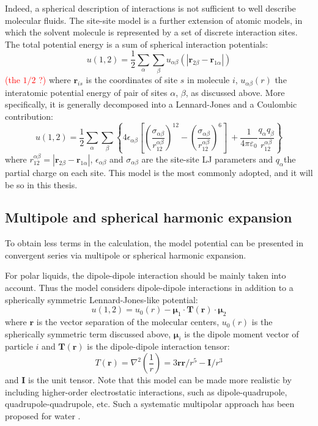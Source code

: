 Indeed, a spherical description of interactions is not sufficient
to well describe molecular fluids. The site-site model is a further
extension of atomic models, in which the solvent molecule is represented
by a set of discrete interaction sites. The total potential energy
is a sum of spherical interaction potentials:
\begin{equation}
u(1,2)=\frac{1}{2}\sum_{\alpha}\sum_{\beta}u_{\alpha\beta}(\left|\mathbf{r}_{2\beta}-\mathbf{r}_{1\alpha}\right|)
\end{equation}
\textcolor{red}{(the $1/2$ ?) }where $\mathbf{r}_{is}$ is the coordinates
of site $s$ in molecule $i$, $u_{\alpha\beta}(r)$ the interatomic
potential energy of pair of sites $\alpha$, $\beta$, as discussed
above. More specifically, it is generally decomposed into a Lennard-Jones
and a Coulombic contribution:
\begin{equation}
u(1,2)=\frac{1}{2}\sum_{\alpha}\sum_{\beta}\left\{ 4\epsilon_{\alpha\beta}\left[\left(\frac{\sigma_{\alpha\beta}}{r_{12}^{\alpha\beta}}\right)^{12}-\left(\frac{\sigma_{\alpha\beta}}{r_{12}^{\alpha\beta}}\right)^{6}\right]\:+\frac{1}{4\pi\varepsilon_{0}}\frac{q_{\alpha}q_{\beta}}{r_{12}^{\alpha\beta}}\right\} 
\end{equation}
where $r_{12}^{\alpha\beta}=\left|\mathbf{r}_{2\beta}-\mathbf{r}_{1\alpha}\right|$,
$\epsilon_{\alpha\beta}$ and $\sigma_{\alpha\beta}$ are the site-site
LJ parameters and $q_{\alpha}$the partial charge on each site. This
model is the most commonly adopted, and it will be so in this thesis.

\subsection{Multipole and spherical harmonic expansion}

To obtain less terms in the calculation, the model potential can be
presented in convergent series via multipole or spherical harmonic
expansion.

For polar liquids, the dipole-dipole interaction should be mainly
taken into account. Thus the model considers dipole-dipole interactions
in addition to a spherically symmetric Lennard-Jones-like potential:
\begin{equation}
u(1,2)=u_{0}(r)-\boldsymbol{\mu}_{1}\cdot\mathbf{T}(\mathbf{r})\cdot\boldsymbol{\mu}_{2}
\end{equation}
where $\mathbf{r}$ is the vector separation of the molecular centers,
$u_{0}(r)$ is the spherically symmetric term discussed above, $\boldsymbol{\mu}_{i}$
is the dipole moment vector of particle $i$ and $\mathbf{T}(\mathbf{r})$
is the dipole-dipole interaction tensor:
\begin{equation}
T(\mathbf{r})=\nabla^{2}\left(\dfrac{1}{r}\right)=3\mathbf{r}\mathbf{r}/r^{5}-\mathbf{I}/r^{3}
\end{equation}
and $\mathbf{I}$ is the unit tensor. Note that this model can be
made more realistic by including higher-order electrostatic interactions,
such as dipole-quadrupole, quadrupole-quadrupole, etc. Such a systematic
multipolar approach has been proposed for water \citep{Chowdhuri_2006}.

